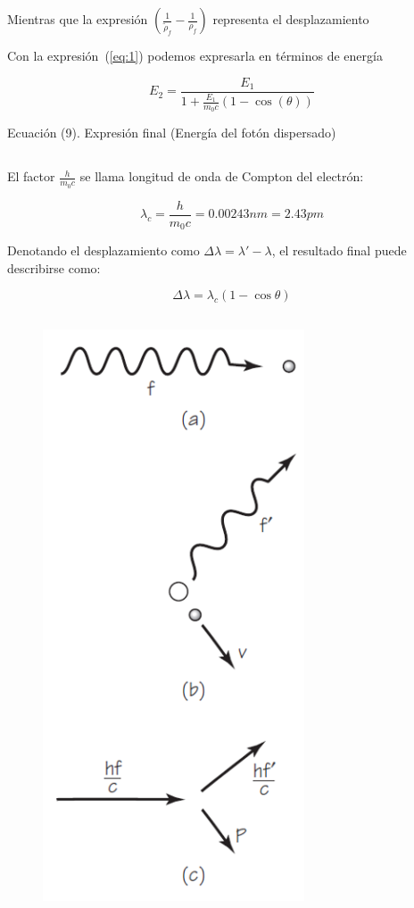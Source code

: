 \documentclass[letterpaper, 12pt]{article}
\begin{document}
Mientras que la expresión $(\frac{1}{\widetilde{\rho}_{f}}
      - \frac{1}{\rho_{f}})$ representa el desplazamiento

Con la expresión~(\ref{eq:1}) podemos expresarla en
términos de energía

\begin{equation}
      E_{2} = \frac{E_{1}}{1 + \frac{E_1}{m_{0} c} (1 - \cos(\theta))}
\end{equation}

Ecuación (9). Expresión final (Energía del fotón
dispersado)

\subsection{\cite{Moebs_2021}}

El factor $\frac{h}{m_{0} c}$ se llama longitud de onda de
Compton del electrón:

\begin{equation}
      \lambda_{c} = \frac{h}{m_{0} c} = 0.00243 nm = 2.43 pm
\end{equation}

Denotando el desplazamiento como $\Delta \lambda = \lambda'
      - \lambda$, el resultado final puede describirse como:

\begin{equation}
      \Delta \lambda = \lambda_{c} (1 - \cos\theta)
\end{equation}

\vfill{} \break{}

\subsection{\cite{Tomé_2019}}

\begin{figure}
      \begin{center}
            \includegraphics[width=.3\textwidth]{Images/Imagen_4.png}
      \end{center}
\end{figure}
\end{document}
